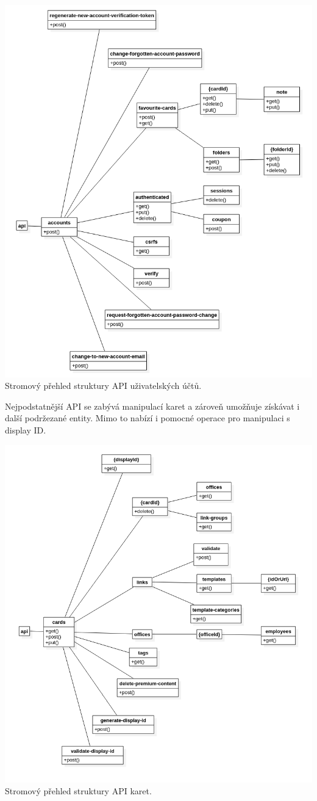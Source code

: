 \begin{itemize}
\begin{itemize}
		\includegraphics{obrazky/api_model_ucty}\hfill
		Stromový přehled struktury API uživatelských účtů. %

		Nejpodstatnější \ac{API} se zabývá manipulací karet a zároveň umožňuje získávat i další podržezané entity.
		Mimo to nabízí i pomocné operace pro manipulaci s display ID.

		\includegraphics{obrazky/api_model_karty}\hfill
		Stromový přehled struktury API karet. %


\end{itemize}
\end{itemize}
